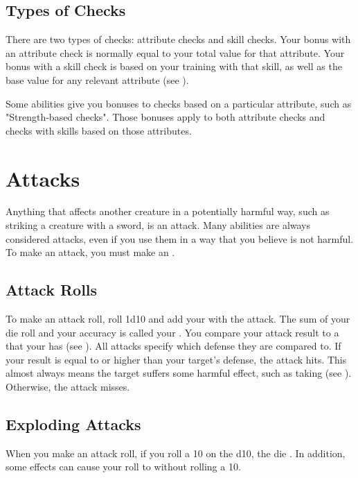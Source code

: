     \subsection{Types of Checks}
        There are two types of checks: attribute checks and skill checks.
        Your bonus with an attribute check is normally equal to your total value for that attribute.
        Your bonus with a skill check is based on your training with that skill, as well as the base value for any relevant attribute (see ).

        Some abilities give you bonuses to checks based on a particular attribute, such as "Strength-based checks".
        Those bonuses apply to both attribute checks and checks with skills based on those attributes.

\section{Attacks}
    Anything that affects another creature in a potentially harmful way, such as striking a creature with a sword, is an attack.
    Many abilities are always considered attacks, even if you use them in a way that you believe is not harmful.
    To make an attack, you must make an .

    \subsection{Attack Rolls}

        To make an attack roll, roll 1d10 and add your  with the attack.
        The sum of your die roll and your accuracy is called your .
        You compare your attack result to a  that your  has (see ).
        All attacks specify which defense they are compared to.
        If your result is equal to or higher than your target's defense, the attack hits.
        This almost always means the target suffers some harmful effect, such as taking  (see ).
        Otherwise, the attack misses.

    \subsection{Exploding Attacks}\label{Exploding Attacks}
        When you make an attack roll, if you roll a 10 on the d10, the die .
        In addition, some effects can cause your roll to  without rolling a 10.


